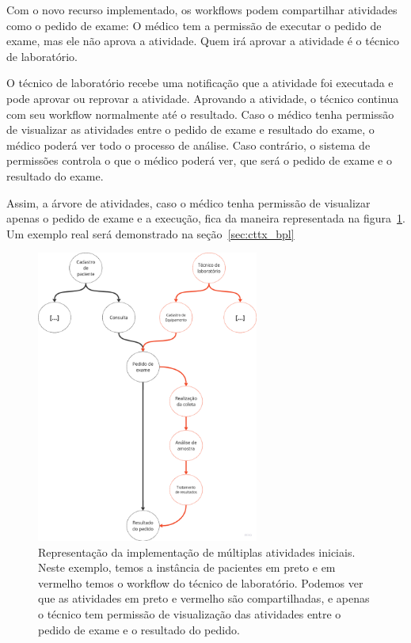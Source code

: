 Com o novo recurso implementado, os workflows podem compartilhar atividades como o pedido de exame: O médico tem a permissão de executar o pedido de exame, mas ele não aprova a atividade. Quem irá aprovar a atividade é o técnico de laboratório.

O técnico de laboratório recebe uma notificação que a atividade foi executada e pode aprovar ou reprovar a atividade.
Aprovando a atividade, o técnico continua com seu workflow normalmente até o resultado.
Caso o médico tenha permissão de visualizar as atividades entre o pedido de exame e resultado do exame, o médico poderá ver todo o processo de análise.
Caso contrário, o sistema de permissões controla o que o médico poderá ver, que será o pedido de exame e o resultado do exame.

Assim, a árvore de atividades, caso o médico tenha permissão de visualizar apenas o pedido de exame e a execução, fica da maneira representada na figura~\ref{fig:segunda_implementacao}. Um exemplo real será demonstrado na seção~\ref{sec:cttx_bpl}

\begin{figure}
    \centering
    \includegraphics[width=0.65\textwidth]{imgs/Exemplo/exemplo_pedido_exame.png}
    \caption{Representação da implementação de múltiplas atividades iniciais. Neste exemplo, temos a instância de pacientes em preto e em vermelho temos o workflow do técnico de laboratório. Podemos ver que as atividades em preto e vermelho são compartilhadas, e apenas o técnico tem permissão de visualização das atividades entre o pedido de exame e o resultado do pedido.}
    \label{fig:segunda_implementacao}
\end{figure}

